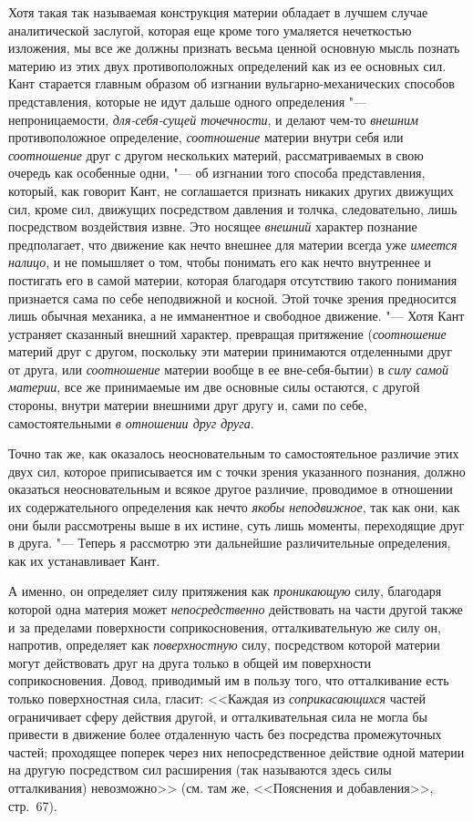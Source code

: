 Хотя такая так называемая конструкция материи обладает в лучшем случае
аналитической заслугой, которая еще кроме того умаляется нечеткостью
изложения, мы все же должны признать весьма ценной основную мысль познать
материю из этих двух противоположных определений как из ее основных сил.
Кант старается главным образом об изгнании вульгарно-механических способов
представления, которые не идут дальше одного определения "---
непроницаемости, {\em для-себя-сущей точечности}, и делают чем-то
{\em внешним} противоположное определение,
{\em соотношение} материи внутри себя или
{\em соотношение} друг с другом нескольких материй,
рассматриваемых в свою очередь как особенные одни, "--- об изгнании того
способа представления, который, как говорит Кант, не соглашается признать
никаких других движущих сил, кроме сил, движущих посредством давления и
толчка, следовательно, лишь посредством воздействия извне. Это носящее
{\em внешний} характер познание предполагает, что
движение как нечто внешнее для материи всегда уже
{\em имеется налицо}, и не помышляет о том, чтобы
понимать его как нечто внутреннее и постигать его в самой материи, которая
благодаря отсутствию такого понимания признается сама по себе неподвижной и
косной. Этой точке зрения предносится лишь обычная механика, а не
имманентное и свободное движение. "--- Хотя Кант устраняет сказанный внешний
характер, превращая притяжение ({\em соотношение}
материй друг с другом, поскольку эти материи принимаются отделенными друг
от друга, или {\em соотношение} материи вообще в ее
вне-себя-бытии) в {\em силу самой материи}, все же
принимаемые им две основные силы остаются, с другой стороны, внутри материи
внешними друг другу и, сами по себе, самостоятельными
{\em в отношении друг друга}.

Точно так же, как оказалось неосновательным то самостоятельное различие этих
двух сил, которое приписывается им с точки зрения указанного познания,
должно оказаться неосновательным и всякое другое различие, проводимое в
отношении их содержательного определения как нечто
{\em якобы неподвижное}, так как они, как они были
рассмотрены выше в их истине, суть лишь моменты, переходящие друг в друга.
"--- Теперь я рассмотрю эти дальнейшие различительные определения, как их
устанавливает Кант.

А именно, он определяет силу притяжения как
{\em проникающую} силу, благодаря которой одна материя
может {\em непосредственно} действовать на части другой
также и за пределами поверхности соприкосновения, отталкивательную же силу
он, напротив, определяет как {\em поверхностную} силу,
посредством которой материи могут действовать друг на друга только в общей
им поверхности соприкосновения. Довод, приводимый им в пользу того, что
отталкивание есть только поверхностная сила, гласит:
<<Каждая из {\em соприкасающихся} частей ограничивает
сферу действия другой, и отталкивательная сила не могла бы привести в
движение более отдаленную часть без посредства промежуточных частей;
проходящее поперек через них непосредственное действие одной материи на
другую посредством сил расширения (так называются здесь силы отталкивания)
невозможно>> (см. там же, <<Пояснения и добавления>>, стр.~67).

